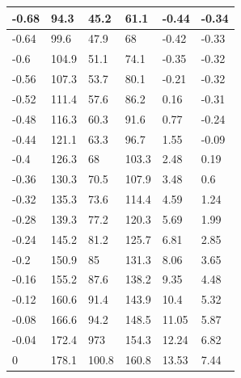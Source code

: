 \documentclass[a4paper]{ltxdoc}
\begin{document}
{\begin{longtable}{|l|l|l|l|l|l|}
        -0.68  & 94.3          & 45.2          & 61.1          & -0.44           & -0.34         \\ \hline
        -0.64  & 99.6          & 47.9          & 68            & -0.42           & -0.33         \\ \hline
        -0.6   & 104.9         & 51.1          & 74.1          & -0.35           & -0.32         \\ \hline
        -0.56  & 107.3         & 53.7          & 80.1          & -0.21           & -0.32         \\ \hline
        -0.52  & 111.4         & 57.6          & 86.2          & 0.16            & -0.31         \\ \hline
        -0.48  & 116.3         & 60.3          & 91.6          & 0.77            & -0.24         \\ \hline
        -0.44  & 121.1         & 63.3          & 96.7          & 1.55            & -0.09         \\ \hline
        -0.4   & 126.3         & 68            & 103.3         & 2.48            & 0.19          \\ \hline
        -0.36  & 130.3         & 70.5          & 107.9         & 3.48            & 0.6           \\ \hline
        -0.32  & 135.3         & 73.6          & 114.4         & 4.59            & 1.24          \\ \hline
        -0.28  & 139.3         & 77.2          & 120.3         & 5.69            & 1.99          \\ \hline
        -0.24  & 145.2         & 81.2          & 125.7         & 6.81            & 2.85          \\ \hline
        -0.2   & 150.9         & 85            & 131.3         & 8.06            & 3.65          \\ \hline
        -0.16  & 155.2         & 87.6          & 138.2         & 9.35            & 4.48          \\ \hline
        -0.12  & 160.6         & 91.4          & 143.9         & 10.4            & 5.32          \\ \hline
        -0.08  & 166.6         & 94.2          & 148.5         & 11.05           & 5.87          \\ \hline
        -0.04  & 172.4         & 973           & 154.3         & 12.24           & 6.82          \\ \hline
        0      & 178.1         & 100.8         & 160.8         & 13.53           & 7.44          \\ \hline
    \end{longtable}}
\newpage
\end{document}
